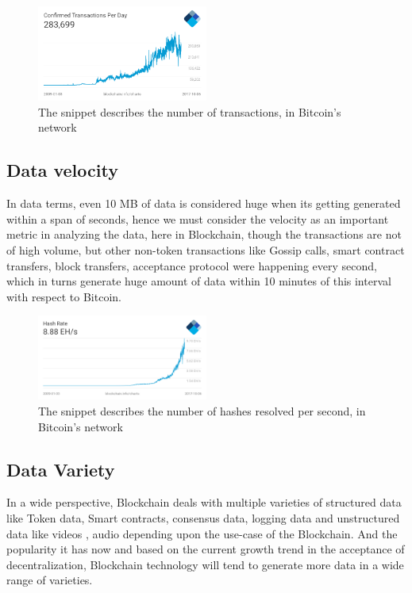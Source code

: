 \documentclass[sigconf]{acmart}
\begin{document}
\begin{figure}
  \centering
  \includegraphics[width=0.5\textwidth]{images/bitcoin-trans.png}
  \caption{The snippet describes the number of transactions, in Bitcoin's network } 
  \label{fig:Figure1} 
\end{figure}

\subsection{Data velocity}
In data terms, even 10 MB of data is considered huge when its getting generated within a span of seconds, hence we must consider the velocity as an important metric in analyzing the data, here in Blockchain, though the transactions are not of high volume, but other non-token transactions like Gossip calls, smart contract transfers, block transfers, acceptance protocol were happening every second, which in turns generate huge amount of data within 10 minutes of this interval with respect to Bitcoin.

\begin{figure}
  \centering
  \includegraphics[width=0.5\textwidth]{images/hash-rate.png}
  \caption{The snippet describes the number of hashes resolved per second, in Bitcoin's network \cite{hastratepersec}} 
  \label{fig:Figure2} 
\end{figure}

\subsection{Data Variety}
In a wide perspective, Blockchain deals with multiple varieties of structured data like Token data, Smart contracts, consensus data, logging data and unstructured data like videos \cite{livepeer-BC-stream}, audio depending upon the use-case of the Blockchain. And the popularity it has now and based on the current growth trend in the acceptance of decentralization, Blockchain technology will tend to generate more data in a wide range of varieties.
\end{document}
